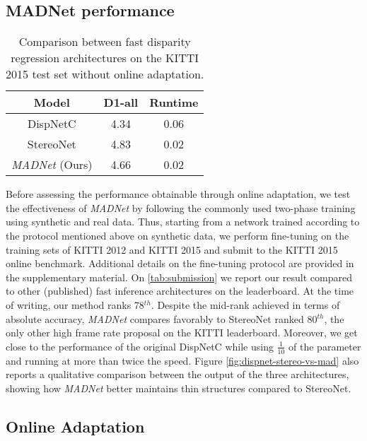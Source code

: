 \documentclass[10pt,twocolumn,letterpaper]{article}
\def\netname{\emph{MADNet}}
\def\kitti{KITTI}
\begin{document}
\subsection{MADNet performance}
\label{sec:expr_network}

\begin{table}[]
    \centering
    \begin{tabular}{|c|c|c|}
        \hline
        Model & D1-all & Runtime \\
        \hline
        DispNetC \cite{mayer2016large} & 4.34 &  0.06 \\  
        StereoNet \cite{khamis2018stereonet} & 4.83 & 0.02 \\
        \netname{} (Ours) & 4.66 & 0.02\\ 
         \hline
    \end{tabular}
    \caption{Comparison between fast disparity regression architectures on the \kitti{} 2015 test set without online adaptation.}
    \label{tab:submission}
\end{table}

Before assessing the performance obtainable through online adaptation, we test the effectiveness of \netname{} by following the commonly used two-phase training using synthetic \cite{mayer2016large} and real data. Thus, starting from a network trained according to the protocol mentioned above on synthetic data, we perform fine-tuning on the training sets of \kitti{} 2012 and \kitti{} 2015 and submit to the \kitti{} 2015 online benchmark. Additional details on the fine-tuning protocol are provided in the supplementary material. On \autoref{tab:submission} we report our result compared to other (published) fast inference architectures on the leaderboard. At the time of writing, our method ranks 78$^{th}$. Despite the mid-rank achieved in terms of absolute accuracy,  \netname{} compares favorably to StereoNet \cite{khamis2018stereonet} ranked 80$^{th}$, the only other high frame rate proposal on the KITTI leaderboard. Moreover, we get close to the performance of the original DispNetC \cite{mayer2016large} while using $\frac{1}{10}$ of the parameter and running at more than twice the speed. 
Figure \ref{fig:dispnet-stereo-vs-mad} also reports a qualitative comparison between the output of the three architectures, showing how \netname{} better maintains thin structures compared to StereoNet.

\subsection{Online Adaptation}
\label{sec:exp_adaptation}
\end{document}
